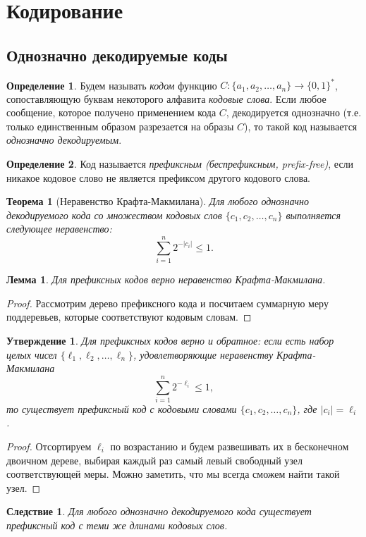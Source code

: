 \documentclass[12pt]{article}
\newcommand{\binstr}{\{0,1\}^*}
\newcommand{\seqn}[2]{{#1}_1,{#1}_2,\dotsc,{#1}_{#2}}
\theoremstyle{definition}
\newtheorem{definition}{Определение}
\theoremstyle{plain}
\newtheorem{theorem}{Теорема}[section]
\newtheorem{lemma}{Лемма}[section]
\newtheorem{statement}{Утверждение}[section]
\newtheorem{corollary}{Следствие}[section]
\theoremstyle{remark}
\begin{document}
\section{Кодирование}
\subsection{Однозначно декодируемые коды}
\begin{definition}
    Будем называть \emph{кодом} функцию $C:\{\seqn{a}{n}\}\to\binstr$,
    сопоставляющую буквам некоторого алфавита \emph{кодовые слова}.
    Если любое сообщение, которое получено применением кода $C$, декодируется
    однозначно (т.е. только единственным образом разрезается на образы $C$), 
    то такой код называется \emph{однозначно декодируемым}.
\end{definition}

\begin{definition}
    Код называется \emph{префиксным (беспрефиксным, prefix-free)}, если никакое
    кодовое слово не является префиксом другого кодового слова.
\end{definition}

\begin{theorem}[Неравенство Крафта-Макмилана]\label{thm:mcmill}
    Для любого однозначно декодируемого кода со множеством кодовых слов 
    \(\{\seqn{c}{n}\}\) выполняется следующее неравенство:
    \[
        \sum_{i=1}^{n} 2^{-|c_i|} \le 1.
    \]
\end{theorem}
\begin{lemma}
    Для префиксных кодов верно неравенство Крафта-Макмилана.
\end{lemma}
\begin{proof}
    Рассмотрим дерево префиксного кода и посчитаем суммарную меру поддеревьев,
    которые соответствуют кодовым словам.
\end{proof}

\begin{statement}
    Для префиксных кодов верно и обратное: если есть набор целых чисел
    \(\{\seqn{\ell}{n}\}\),
    удовлетворяющие неравенству Крафта-Макмилана
    \[
        \sum_{i=1}^{n} 2^{-\ell_i} \le 1,
    \]
    то существует префиксный код с кодовыми
    словами \(\{\seqn{c}{n}\}\), где \(|c_i| = \ell_i\).
\end{statement}
\begin{proof}
    Отсортируем $\ell_i$ по возрастанию и будем развешивать их в бесконечном
    двоичном дереве, выбирая каждый раз самый левый свободный узел
    соответствующей меры. Можно заметить, что мы всегда сможем найти такой узел.
\end{proof}
\begin{corollary}
    Для любого однозначно декодируемого кода существует префиксный код с теми же
    длинами кодовых слов.
\end{corollary}
\end{document}
